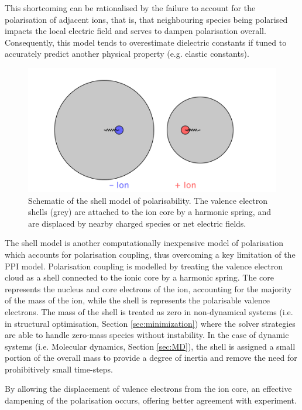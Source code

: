 This shortcoming can be rationalised by the failure to account for the polarisation of adjacent ions, that is, that neighbouring species being polarised impacts the local electric field and serves to dampen polarisation overall.
Consequently, this model tends to overestimate dielectric constants if tuned to accurately predict another physical property (e.g. elastic constants).


\begin{figure}[ht]
  \centering
  \includegraphics[width=\linewidth]{figures/coreshell/coreshell}
  \caption[Shell model schematic]{Schematic of the shell model of polarisability. The valence electron shells (grey) are attached to the ion core by a harmonic spring, and are displaced by nearby charged species or net electric fields.}
\end{figure}
The shell model\cite{Dick1958} is another computationally inexpensive model of polarisation which accounts for polarisation coupling, thus overcoming a key limitation of the PPI model.
Polarisation coupling is modelled by treating the valence electron cloud as a shell connected to the ionic core by a harmonic spring.
The core represents the nucleus and core electrons of the ion, accounting for the majority of the mass of the ion, while the shell is represents the polarisable valence electrons.
The mass of the shell is treated as zero in non-dynamical systems (i.e. in structural optimisation, Section \ref{sec:minimization}) where the solver strategies are able to handle zero-mass species without instability.
In the case of dynamic systems (i.e. Molecular dynamics, Section \ref{sec:MD}), the shell is assigned a small portion of the overall mass to provide a degree of inertia and remove the need for prohibitively small time-steps.

By allowing the displacement of valence electrons from the ion core, an effective dampening of the polarisation occurs, offering better agreement with experiment.

